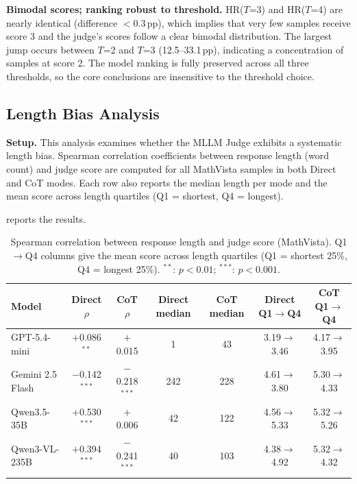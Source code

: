 \textbf{Bimodal scores; ranking robust to threshold.}
HR($T$=3) and HR($T$=4) are nearly identical
(difference $<$0.3\,pp),
which implies that very few samples receive score 3
and the judge's scores follow a clear bimodal distribution.
The largest jump occurs between $T$=2 and $T$=3
(12.5--33.1\,pp),
indicating a concentration of samples at score 2.
The model ranking is fully preserved
across all three thresholds,
so the core conclusions are insensitive to the threshold choice.

\subsection{Length Bias Analysis}

\textbf{Setup.}
This analysis examines whether the MLLM Judge
exhibits a systematic length bias.
Spearman correlation coefficients
between response length (word count) and judge score
are computed for all MathVista samples
in both Direct and CoT modes.
Each row also reports the median length per mode
and the mean score across length quartiles
(Q1 = shortest, Q4 = longest).

 reports the results.

\begin{table}[htbp]
  \centering
  \caption{Spearman correlation between response length
    and judge score (MathVista).
    Q1$\to$Q4 columns give the mean score
    across length quartiles
    (Q1 = shortest 25\%, Q4 = longest 25\%).
    $^{**}$: $p < 0.01$; $^{***}$: $p < 0.001$.}
  \label{tab:length_bias}
  \small
  \setlength{\tabcolsep}{3pt}
  \begin{tabular}{l cc cc cc}
    \toprule
    Model & Direct $\rho$ & CoT $\rho$
      & Direct median & CoT median
      & Direct Q1$\to$Q4 & CoT Q1$\to$Q4 \\
    \midrule
    GPT-5.4-mini
      & $+$0.086$^{**}$ & $+$0.015
      & 1 & 43
      & 3.19$\to$3.46 & 4.17$\to$3.95 \\
    Gemini 2.5 Flash
      & $-$0.142$^{***}$ & $-$0.218$^{***}$
      & 242 & 228
      & 4.61$\to$3.80 & 5.30$\to$4.33 \\
    Qwen3.5-35B
      & $+$0.530$^{***}$ & $+$0.006
      & 42 & 122
      & 4.56$\to$5.33 & 5.32$\to$5.26 \\
    Qwen3-VL-235B
      & $+$0.394$^{***}$ & $-$0.241$^{***}$
      & 40 & 103
      & 4.38$\to$4.92 & 5.32$\to$4.32 \\
    \bottomrule
  \end{tabular}
\end{table}

